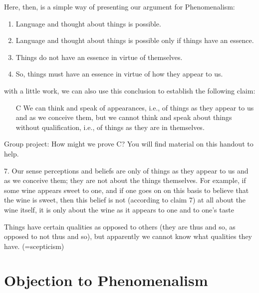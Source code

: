 \documentclass[article,oneside]{memoir}
\begin{document}
\begin{quotations}
\begin{enumerate}
{Here, then, is a simple way of presenting our argument for Phenomenalism: 

\begin{enumerate}
\item Language and thought about things is possible. 
\item Language and thought about things is possible only if things have an essence. 
\item Things do not have an essence in virtue of themselves. 
\item So, things must have an essence in virtue of how they appear to us. 
\end{enumerate}
with a little work, we can also use this conclusion to establish the following claim: 

\begin{itemize}
\item[C] We can think and speak of appearances, i.e., of things as they appear to us and as we conceive them, but we cannot think and speak about things without qualification, i.e., of things as they are in themselves. 
\end{itemize}
Group project: How might we prove C? You will find material on this handout to help. 

7. Our sense perceptions and beliefs are only of things as they appear to us and as we conceive them; they are not about the things themselves.
For example, if some wine appears sweet to one, and if one goes on on this basis to believe that the wine is sweet, then this belief is not (according to claim 7) at all about the wine itself, it is only about the wine as it appears to one and to one’s taste

Things have certain qualities as opposed to others (they are thus and so, as opposed to not thus and so), but apparently we cannot know what qualities they have. (=scepticism)

\section{Objection to Phenomenalism}

}
\end{enumerate}
\end{quotations}
\end{document}
